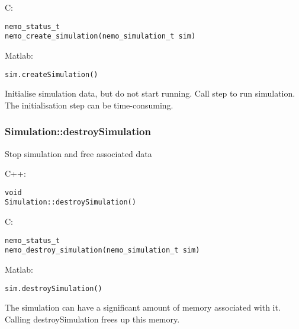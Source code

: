 \noindent C:
\begin{lstlisting}[aboveskip=2pt]
nemo_status_t
nemo_create_simulation(nemo_simulation_t sim)
\end{lstlisting}

\noindent Matlab:
\begin{lstlisting}[aboveskip=2pt]
sim.createSimulation()
\end{lstlisting}
Initialise simulation data, but do not start running. Call step to run simulation. The initialisation step can be time-consuming.

\clearpage
\subsubsection*{Simulation::destroySimulation}
\label{fn: destroySimulation}
Stop simulation and free associated data


\noindent C++:
\begin{lstlisting}[aboveskip=2pt]
void
Simulation::destroySimulation()
\end{lstlisting}

\noindent C:
\begin{lstlisting}[aboveskip=2pt]
nemo_status_t
nemo_destroy_simulation(nemo_simulation_t sim)
\end{lstlisting}

\noindent Matlab:
\begin{lstlisting}[aboveskip=2pt]
sim.destroySimulation()
\end{lstlisting}
The simulation can have a significant amount of memory associated with it. Calling destroySimulation frees up this memory.

\clearpage